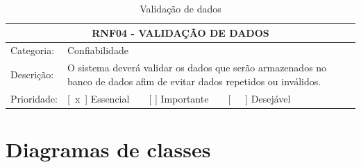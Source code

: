 \begin{anexosenv}
\begin{table}[htbp]
	\centering
	\caption{Validação de dados}
	\label{tab:rnf04}
	\begin{tabular}{l p{10cm}}
		\toprule
		\multicolumn{2}{c}{RNF04 - VALIDAÇÃO DE DADOS} \\ \midrule
		Categoria:  & Confiabilidade\\ \midrule
		Descrição:  & O sistema deverá validar os dados que serão armazenados no banco de dados afim de evitar dados repetidos ou inválidos.\\ \midrule
		Prioridade: & [ x ] Essencial    [   ] Importante    [   ] Desejável \\ \bottomrule
	\end{tabular}
\end{table}


\chapter{Diagramas de classes}


\end{anexosenv}
